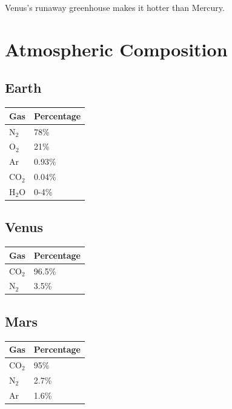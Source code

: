 \documentclass[
  11pt,
  letterpaper,
  twoside,
  openright]{book}
\begin{document}
Venus's runaway greenhouse makes it hotter than Mercury.

\section{Atmospheric Composition}\label{atmospheric-composition}

\subsection{Earth}\label{earth}

\begin{longtable}[]{@{}ll@{}}
\toprule\noalign{}
Gas & Percentage \\
\midrule\noalign{}
\endhead
\bottomrule\noalign{}
\endlastfoot
\(\text{N}_2\) & 78\% \\
\(\text{O}_2\) & 21\% \\
Ar & 0.93\% \\
\(\text{CO}_2\) & 0.04\% \\
\(\text{H}_2\text{O}\) & 0-4\% \\
\end{longtable}

\subsection{Venus}\label{venus}

\begin{longtable}[]{@{}ll@{}}
\toprule\noalign{}
Gas & Percentage \\
\midrule\noalign{}
\endhead
\bottomrule\noalign{}
\endlastfoot
\(\text{CO}_2\) & 96.5\% \\
\(\text{N}_2\) & 3.5\% \\
\end{longtable}

\subsection{Mars}\label{mars}

\begin{longtable}[]{@{}ll@{}}
\toprule\noalign{}
Gas & Percentage \\
\midrule\noalign{}
\endhead
\bottomrule\noalign{}
\endlastfoot
\(\text{CO}_2\) & 95\% \\
\(\text{N}_2\) & 2.7\% \\
Ar & 1.6\% \\
\end{longtable}
\end{document}
